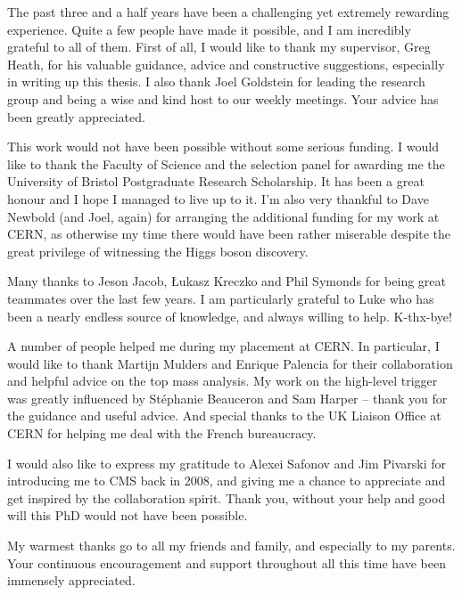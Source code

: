 


\begin{acknowledgements}
The past three and a half years have been a challenging yet extremely rewarding experience. Quite a few people have made
it possible, and I am incredibly grateful to all of them. First of all, I would like to thank my supervisor, Greg Heath,
for his valuable guidance, advice and constructive suggestions, especially in writing up this thesis. I also thank Joel
Goldstein for leading the research group and being a wise and kind host to our weekly meetings. Your advice has been
greatly appreciated.

This work would not have been possible without some serious funding. I would like to thank the Faculty of Science and
the selection panel for awarding me the University of Bristol Postgraduate Research Scholarship. It has been a great
honour and I hope I managed to live up to it. I'm also very thankful to Dave Newbold (and Joel, again) for arranging the
additional funding for my work at CERN, as otherwise my time there would have been rather miserable despite the great
privilege of witnessing the Higgs boson discovery.

Many thanks to Jeson Jacob, \L{}ukasz Kreczko and Phil Symonds for being great teammates over the last few years. I am
particularly grateful to Luke who has been a nearly endless source of knowledge, and always willing to help. K-thx-bye!

A number of people helped me during my placement at CERN. In particular, I would like to thank Martijn Mulders and
Enrique Palencia for their collaboration and helpful advice on the top mass analysis. My work on the high-level trigger
was greatly influenced by St\'{e}phanie Beauceron and Sam Harper -- thank you for the guidance and useful advice. And
special thanks to the UK Liaison Office at CERN for helping me deal with the French bureaucracy.

I would also like to express my gratitude to Alexei Safonov and Jim Pivarski for introducing me to CMS back in 2008, and
giving me a chance to appreciate and get inspired by the collaboration spirit. Thank you, without your help and good
will this PhD would not have been possible.

My warmest thanks go to all my friends and family, and especially to my parents. Your continuous encouragement and
support throughout all this time have been immensely appreciated. %

\end{acknowledgements}


